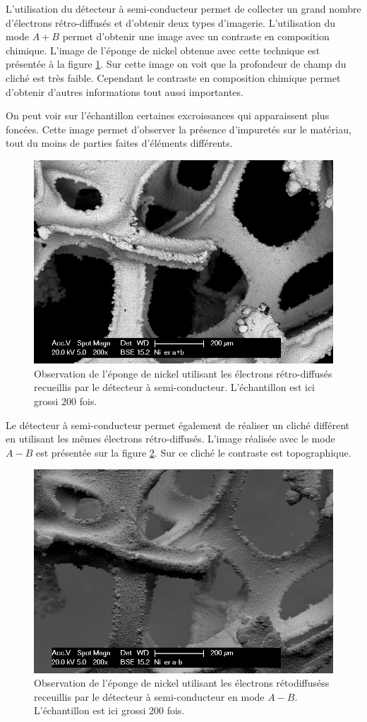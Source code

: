 \documentclass[a4paper,12pt]{article}
\begin{document}
L'utilisation du détecteur à semi-conducteur permet de collecter un grand nombre d'électrons rétro-diffusés
et d'obtenir deux types d'imagerie. L'utilisation du mode $A+B$ permet d'obtenir une image avec un contraste
en composition chimique. L'image de l'éponge de nickel obtenue avec cette technique est présentée à la figure
\ref{fig:ni_er_apb}. Sur cette image on voit que la profondeur de champ du cliché est très faible. Cependant
le contraste en composition chimique permet d'obtenir d'autres informations tout aussi importantes.

On peut voir sur l'échantillon certaines excroissances qui apparaissent plus foncées. Cette image permet d'observer
la présence d'impuretés sur le matériau, tout du moins de parties faites d'éléments différents.


\begin{figure}
\centering
\includegraphics[width = 0.7 \textwidth]{images/ni_er_apb.png}
\caption{Observation de l'éponge de nickel utilisant les électrons rétro-diffusés recueillis par le détecteur à semi-conducteur. L'échantillon est ici grossi 200 fois.}
\label{fig:ni_er_apb}
\end{figure}



Le détecteur à semi-conducteur permet également de réaliser un cliché différent en utilisant les mêmes électrons
rétro-diffusés. L'image réalisée avec le mode $A-B$ est présentée sur la figure \ref{fig:ni_er_amb}. Sur ce cliché
le contraste est topographique.

\begin{figure}
\centering
\includegraphics[width = 0.7 \textwidth]{images/ni_er_amb.png}
\caption{Observation de l'éponge de nickel utilisant les électrons rétodiffuséss receuillis par le détecteur à semi-conducteur en mode $A-B$. L'échantillon est ici grossi 200 fois.}
\label{fig:ni_er_amb}
\end{figure}
 
\end{document}
